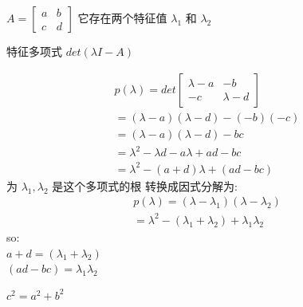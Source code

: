 \documentclass[12pt]{article}
\begin{document}
\begin{flushleft}
    $A = \begin{bmatrix}
            a & b \\
            c & d
        \end{bmatrix}$
    它存在两个特征值 $\lambda_{1}$ 和 $\lambda_{2}$

    特征多项式  $det(\lambda I - A)$

    \begin{align*}
        p(\lambda) = det \begin{bmatrix}
                             \lambda - a & -b         \\
                             -c          & \lambda -d
                         \end{bmatrix}       \\
        = (\lambda - a ) (\lambda -d) - (-b)(-c)        \\
        = (\lambda - a ) (\lambda -d) - bc              \\
        = \lambda^{2} -\lambda d  - a\lambda + ad  - bc \\
        = \lambda^{2} -(a + d)\lambda  +  (ad - bc)
    \end{align*}
    为 $\lambda_{1}, \lambda_{2}$ 是这个多项式的根 转换成因式分解为: \\
    \begin{align}
        p(\lambda) = (\lambda -  \lambda_{1}) (\lambda - \lambda_{2}) \\
        = \lambda^{2} - (\lambda_{1} + \lambda_{2}) + \lambda_{1}\lambda_{2}
    \end{align}
    so: \\
    $ a + d = (\lambda_{1} + \lambda_{2}) $ \\
    $(ad - bc) = \lambda_{1}\lambda_{2} $


\end{flushleft}




$c^{2} =a^{2} + b^{2}$
\end{document}
